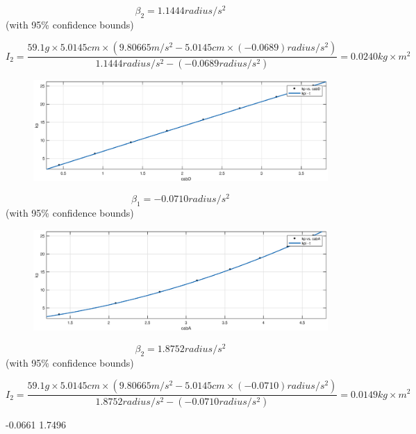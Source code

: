$$ \beta_2 = 1.1444 radius/s^2$$ (with 95\% confidence bounds) 


$$ I_2 = \frac{59.1 g \times 5.0145 cm \times (9.80665 m/s^2 - 5.0145 cm \times (-0.0689) radius/s^2 )}{1.1444 radius/s^2 -(-0.0689 radius/s^2) } =  0.0240 kg\times m^2 $$



\begin{figure}[H]
\centering
\includegraphics[width=\EFWwr]{matlab/cabd}
\end{figure}

$$ \beta_1 = -0.0710 radius/s^2$$ (with 95\% confidence bounds) 

\begin{figure}[H]
\centering
\includegraphics[width=\EFWwr]{matlab/caba}
\end{figure}

$$ \beta_2 = 1.8752 radius/s^2$$ (with 95\% confidence bounds) 


$$ I_2 = \frac{59.1 g \times 5.0145 cm \times (9.80665 m/s^2 - 5.0145 cm \times (-0.0710) radius/s^2 )}{1.8752 radius/s^2 -(-0.0710 radius/s^2) } =  0.0149 kg\times m^2 $$



-0.0661
1.7496
